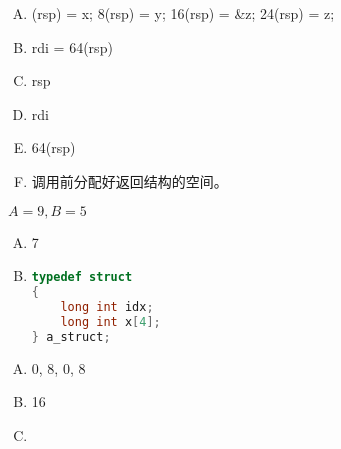 {    %
    \begin{practicec}
        \begin{enumerate}[A.]
            \item
            {
                (rsp) = x;
                8(rsp) = y;
                16(rsp) = \&z;
                24(rsp) = z;
            }
            \item rdi = 64(rsp)
            \item rsp
            \item rdi
            \item 64(rsp)
            \item 调用前分配好返回结构的空间。
        \end{enumerate}
    \end{practicec}

    \begin{practicec}
        $A = 9, B = 5$
    \end{practicec}

    \begin{practicec}
        \begin{enumerate}[A.]
            \item 7
            \item
            {
                \begin{lstlisting}[language=C]
typedef struct
{
    long int idx;
    long int x[4];
} a_struct;
                \end{lstlisting}
            }
        \end{enumerate}
    \end{practicec}

    \begin{practicec}
        \begin{enumerate}[A.]
            \item 0, 8, 0, 8
            \item 16
            \item {}
        \end{enumerate}
    \end{practicec}

    \begin{practicec}

    \end{practicec}

}
